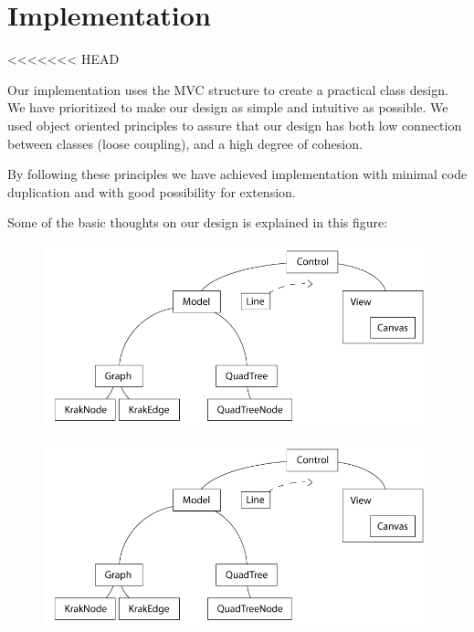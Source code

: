 \chapter{Implementation}
\label{IMPL}
<<<<<<< HEAD

Our implementation uses the MVC structure to create a practical class design. We
have prioritized to make our design as simple and intuitive as possible. We used
object oriented principles to assure that our design has both low connection
between classes (loose coupling), and a high degree of cohesion.

By following these principles we have achieved implementation with minimal code
duplication and with good possibility for extension.

Some of the basic thoughts on our design is explained in this figure:

\begin{figure}[h!]
\centering
\includegraphics[width=1\linewidth]{images/BasicDesign}
\label{The basic design of our implementation. The controller gets a collection
of lines, that the view will draw.}
\end{figure}

\begin{figure}[h!]
\centering
\includegraphics[width=1\linewidth]{images/BasicDesign}
\label{The pathfinding part of our implementation. The static Astar function
takes an Evaluator and a Graph and returns a path.}
\end{figure}

